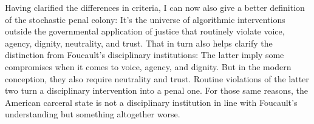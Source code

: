 Having clarified the differences in criteria, I can now also give a better
definition of the stochastic penal colony: It's the universe of algorithmic
interventions outside the governmental application of justice that routinely
violate voice, agency, dignity, neutrality, and trust. That in turn also helps
clarify the distinction from Foucault's disciplinary institutions: The latter
imply some compromises when it comes to voice, agency, and dignity. But in the
modern conception, they also require neutrality and trust. Routine violations of
the latter two turn a disciplinary intervention into a penal one. For those same
reasons, the American carceral state is not a disciplinary institution in line
with Foucault's understanding but something altogether worse.
